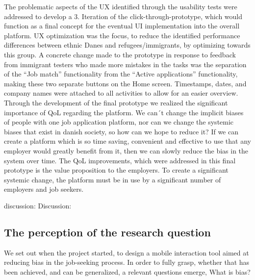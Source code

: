 The problematic aspects of the UX identified through the usability tests were addressed to develop a 3. Iteration of the click-through-prototype, which would function as a final concept for the eventual UI implementation into the overall platform. UX optimization was the focus, to reduce the identified performance differences between ethnic Danes and refugees/immigrants, by optimizing towards this group. A concrete change made to the prototype in response to feedback from immigrant testers who made more mistakes in the tasks was the separation of the “Job match” functionality from the “Active applications” functionality, making these two separate buttons on the Home screen. Timestamps, dates, and company names were attached to all activities to allow for an easier overview.\\

Through the development of the final prototype we realized the significant importance of QoL regarding the platform. We can´t change the implicit biases of people with one job application platform, nor can we change the systemic biases that exist in danish society, so how can we hope to reduce it? If we can create a platform which is so time saving, convenient and effective to use that any employer would greatly benefit from it, then we can slowly reduce the bias in the system over time. The QoL improvements, which were addressed in this final prototype is the value proposition to the employers. To create a significant systemic change, the platform must be in use by a significant number of employers and job seekers.

discussion: 
Discussion:
\subsection{The perception of the research question}

We set out when the project started, to design a mobile interaction tool aimed at reducing bias in the job-seeking process. In order to fully grasp, whether that has been achieved, and can be generalized, a relevant questions emerge, What is bias? \\


